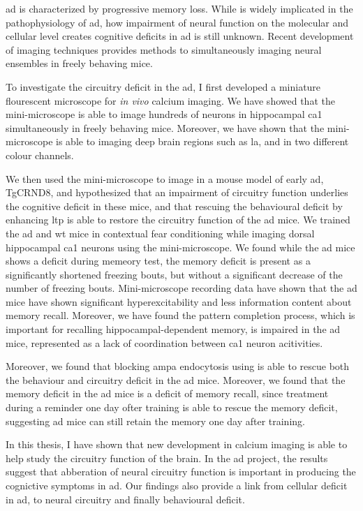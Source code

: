 \Gls{ad} is characterized by progressive memory loss. While \abeta is widely implicated in the pathophysiology of \gls{ad}, how impairment of neural function on the molecular and cellular level creates cognitive deficits in \gls{ad} is still unknown. Recent development of imaging techniques provides methods to simultaneously imaging neural ensembles in freely behaving mice. 

To investigate the circuitry deficit in the \gls{ad}, I first developed a miniature flourescent microscope for \textit{in vivo} calcium imaging. We have showed that the mini-microscope is able to image hundreds of neurons in hippocampal \gls{ca1} simultaneously in freely behaving mice. Moreover, we have shown that the mini-microscope is able to imaging deep brain regions such as \gls{la}, and in two different colour channels. 

We then used the mini-microscope to image in a mouse model of early \gls{ad}, TgCRND8, and hypothesized that an impairment of circuitry function underlies the cognitive deficit in these mice, and that rescuing the behavioural deficit by enhancing \gls{ltp} is able to restore the circuitry function of the \gls{ad} mice. We trained the \gls{ad} and \gls{wt} mice in contextual fear conditioning while imaging dorsal hippocampal \gls{ca1} neurons using the mini-microscope. We found while the \gls{ad} mice shows a deficit during memeory test, the memory deficit is present as a significantly shortened freezing bouts, but without a significant decrease of the number of freezing bouts. Mini-microscope recording data have shown that the \gls{ad} mice have shown significant hyperexcitability and less information content about memory recall. Moreover, we have found the pattern completion process, which is important for recalling hippocampal-dependent memory, is impaired in the \gls{ad} mice, represented as a lack of coordination between \gls{ca1} neuron acitivities. 

Moreover, we found that blocking \gls{ampa} endocytosis using \tglu is able to rescue both the behaviour and circuitry deficit in the \gls{ad} mice. Moreover, we found that the memory deficit in the \gls{ad} mice is a deficit of memory recall, since \tglu treatment during a reminder one day ofter training is able to rescue the memory deficit, suggesting \gls{ad} mice can still retain the memory one day after training. 

In this thesis, I have shown that new development in calcium imaging is able to help study the circuitry function of the brain. In the \gls{ad} project, the results suggest that abberation of neural circuitry function is important in producing the cognictive symptoms in \gls{ad}. Our findings also provide a link from cellular deficit in \gls{ad}, to neural circuitry and finally behavioural deficit. 


